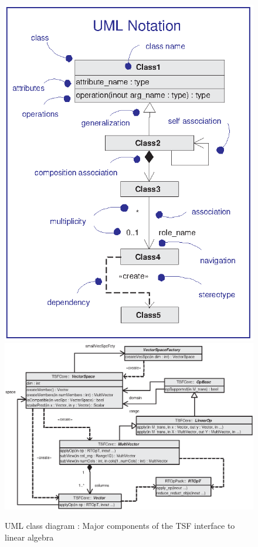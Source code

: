 {\bsinglespace
\begin{figure}[t]
\begin{center}
\includegraphics*[bb= 0.0in 0.0in 3.3in 4.4in,scale=0.40
]{UML1}
\includegraphics*[bb= 0.0in 0.0in 6.55in 4.4in,scale=0.70
]{TSFCore}
\end{center}
\caption{
\label{tsfcore:fig:tsfl_basic}
UML class diagram : Major components of the TSF
interface to linear algebra
}
\end{figure}
\esinglespace}

